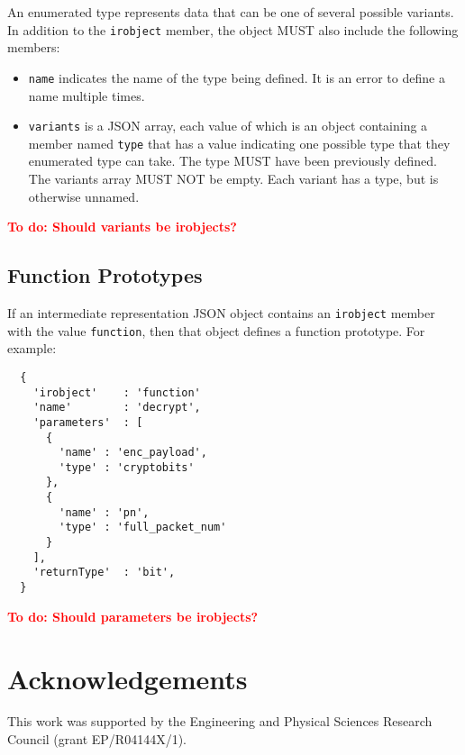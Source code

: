 \documentclass[twocolumn,a4paper]{article}
\newcommand{\todo}[1]{\textbf{\textcolor{red}{To do: #1}}}
\begin{document}
An enumerated type represents data that can be one of several possible
variants. In addition to the \texttt{irobject} member, the object MUST
also include the following members:
\begin{itemize}
  \item \texttt{name} indicates the name of the type being defined. It is
    an error to define a name multiple times.
  \item \texttt{variants} is a JSON array, each value of which is an object
    containing a member named \texttt{type} that has a value indicating one
    possible type that they enumerated type can take. The type MUST have
    been previously defined.  The variants array MUST NOT be empty. Each
    variant has a type, but is otherwise unnamed.
\end{itemize}

\todo{Should variants be irobjects?}

\subsection{Function Prototypes}
\label{sec:funcs}

If an intermediate representation JSON object contains an \texttt{irobject}
member with the value \texttt{function}, then that object defines a function
prototype. For example:

\begin{verbatim}
  {
    'irobject'    : 'function'
    'name'        : 'decrypt',
    'parameters'  : [
      {
        'name' : 'enc_payload',
        'type' : 'cryptobits'
      },
      {
        'name' : 'pn',
        'type' : 'full_packet_num'
      }
    ],
    'returnType'  : 'bit',
  }
\end{verbatim}

\todo{Should parameters be irobjects?}

\section{Acknowledgements}

This work was supported by the Engineering and Physical Sciences Research
Council (grant EP/R04144X/1).
\end{document}
